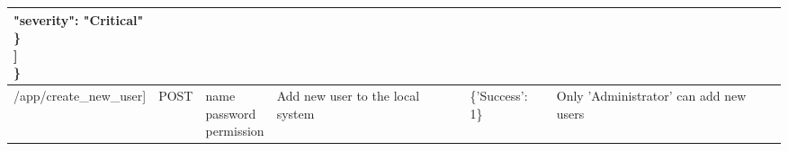 \documentclass[10pt]{article}
\begin{document}
\begin{landscape}
\begin{adjustwidth}{-3cm}{}
\begin{tabular}{| l | l | l | p{3cm} | p{5.5cm} | l |}
{             			\qquad \quad "severity": "Critical" \\ 
             		\qquad \quad \} \\ 
             	\qquad ] \\ 
             \quad \} \\
           } & \\ \hline
     /app/create\_new\_user] & POST & \pbox{25cm}{name \\ password \\ permission} & Add new user to the local system & \{'Success': 1\} & Only 'Administrator' can add new users \\ \hline

\end{tabular}
  \end{adjustwidth}
\end{landscape}
\end{document}
